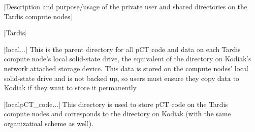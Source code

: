 [Description and purpose/usage of the private user and shared directories on the Tardis compute nodes]
\begin{tcbenvironment}|Tardis|%
\begin{tcbparbox}|\dirsep local\dirsep$\dots$|%
    \bfdash This is the parent directory for all pCT code and data on each Tardis compute node's local solid-state drive, the equivalent of the  directory on Kodiak's network attached storage device.  This data is stored on the compute nodes' local solid-state drive and is not backed up, so users must ensure they copy data to Kodiak if they want to store it permanently
\end{tcbparbox}
\begin{tcbparbox}|\dirsep local\dirsep pCT\_code\dirsep $\dots$|
\bfdash This directory is used to store pCT code on the Tardis compute nodes and corresponds to the  directory on Kodiak (with the same organizatioal scheme as well).
\end{tcbparbox}

\end{tcbenvironment}
